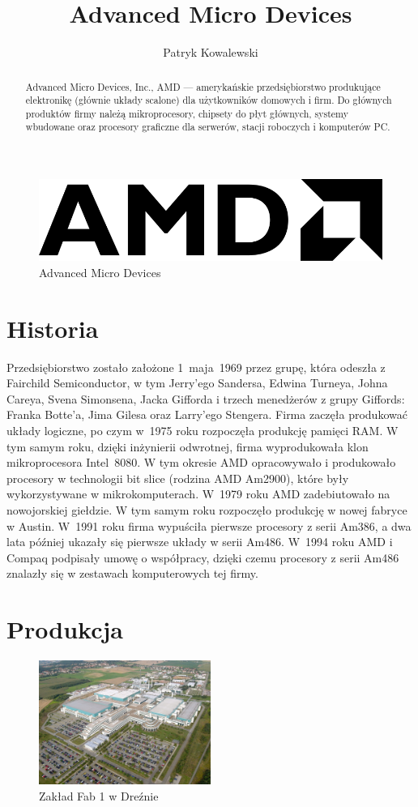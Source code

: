 \documentclass[a4paper,12pt]{article}
\title{Advanced Micro Devices}
\author{Patryk Kowalewski}
\begin{document}
\maketitle

\begin{abstract}\noindent Advanced Micro Devices, Inc., AMD --- amerykańskie przedsiębiorstwo produkujące elektronikę (głównie układy scalone) dla użytkowników domowych i firm. Do głównych produktów firmy należą mikroprocesory, chipsety do płyt głównych, systemy wbudowane oraz procesory graficzne dla serwerów, stacji roboczych i komputerów PC.
\end{abstract}

\begin{figure}[h]
\centering
\includegraphics[width=0.3\hsize]{amd.png}
\caption{Advanced Micro Devices}\label{AMD}
\end{figure}

\section{Historia}

Przedsiębiorstwo zostało założone 1~maja~1969 przez grupę, która odeszła z Fairchild Semiconductor, w tym Jerry’ego Sandersa, Edwina Turneya, Johna Careya, Svena Simonsena, Jacka Gifforda i trzech menedżerów z grupy Giffords: Franka Botte’a, Jima Gilesa oraz Larry’ego Stengera. Firma zaczęła produkować układy logiczne, po czym w~1975 roku rozpoczęła produkcję pamięci RAM. W tym samym roku, dzięki inżynierii odwrotnej, firma wyprodukowała klon mikroprocesora Intel~8080. W tym okresie AMD opracowywało i produkowało procesory w technologii bit slice (rodzina AMD Am2900), które były wykorzystywane w mikrokomputerach. W~1979 roku AMD zadebiutowało na nowojorskiej giełdzie. W tym samym roku rozpoczęło produkcję w nowej fabryce w Austin.
W~1991 roku firma wypuściła pierwsze procesory z serii Am386, a dwa lata później ukazały się pierwsze układy w serii Am486. W~1994 roku AMD i Compaq podpisały umowę o współpracy, dzięki czemu procesory z serii Am486 znalazły się w zestawach komputerowych tej firmy.

\section{Produkcja}

\begin{figure}[h]
\centering
\includegraphics[width=0.5\textwidth]{fab1.jpg}
\caption{Zakład Fab 1 w Dreźnie}\label{Fab 1}
\end{figure}
\end{document}
